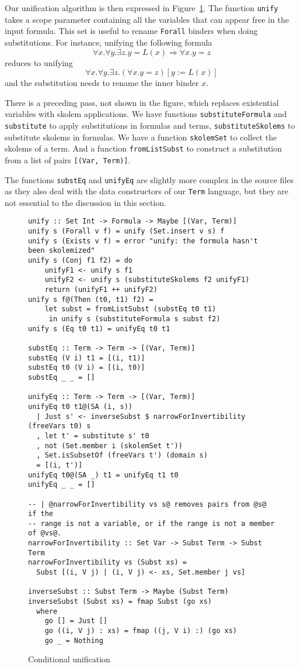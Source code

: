 \documentclass[sigconf, anonymous, review]{acmart}
\newcommand{\tc}[1]{{\small\texttt{#1}}}
\begin{document}
Our unification algorithm is then expressed in Figure~\ref{conditional-unification}.
The function \tc{unify} takes a scope parameter containing all the variables that
can appear free in the input formula. This set is useful to rename \tc{Forall}
binders when doing substitutions. For instance, unifying the following formula
$$\forall x. \forall y. \exists z. y = L(x) \Rightarrow \forall x. y = z$$
reduces to unifying
$$\forall x. \forall y. \exists z. (\forall x. y = z)[y:=L(x)]$$
and the substitution needs to rename the inner binder $x$.

There is a preceding pass, not shown in the figure, which replaces existential variables
with skolem applications. We have functions \tc{substituteFormula} and \tc{substitute}
to apply substitutions in formulas and terms, \tc{substituteSkolems} to  substitute
skolems in formulas. We have a function \tc{skolemSet} to collect the skolems of a
term. And a function \tc{fromListSubst} to construct a substitution from a list of
pairs \tc{[(Var, Term)]}.

The functions \tc{substEq} and \tc{unifyEq} are slightly more complex in the source files
as they also deal with the data constructors of our \tc{Term} language, but they are
not essential to the discussion in this section.

\begin{figure}
\begin{verbatim}
unify :: Set Int -> Formula -> Maybe [(Var, Term)]
unify s (Forall v f) = unify (Set.insert v s) f
unify s (Exists v f) = error "unify: the formula hasn't been skolemized"
unify s (Conj f1 f2) = do
    unifyF1 <- unify s f1
    unifyF2 <- unify s (substituteSkolems f2 unifyF1)
    return (unifyF1 ++ unifyF2)
unify s f@(Then (t0, t1) f2) =
    let subst = fromListSubst (substEq t0 t1)
     in unify s (substituteFormula s subst f2)
unify s (Eq t0 t1) = unifyEq t0 t1

substEq :: Term -> Term -> [(Var, Term)]
substEq (V i) t1 = [(i, t1)]
substEq t0 (V i) = [(i, t0)]
substEq _ _ = []

unifyEq :: Term -> Term -> [(Var, Term)]
unifyEq t0 t1@(SA (i, s))
  | Just s' <- inverseSubst $ narrowForInvertibility (freeVars t0) s
  , let t' = substitute s' t0
  , not (Set.member i (skolemSet t'))
  , Set.isSubsetOf (freeVars t') (domain s)
  = [(i, t')]
unifyEq t0@(SA _) t1 = unifyEq t1 t0
unifyEq _ _ = []

-- | @narrowForInvertibility vs s@ removes pairs from @s@ if the
-- range is not a variable, or if the range is not a member of @vs@.
narrowForInvertibility :: Set Var -> Subst Term -> Subst Term
narrowForInvertibility vs (Subst xs) =
  Subst [(i, V j) | (i, V j) <- xs, Set.member j vs]

inverseSubst :: Subst Term -> Maybe (Subst Term)
inverseSubst (Subst xs) = fmap Subst (go xs)
  where
    go [] = Just []
    go ((i, V j) : xs) = fmap ((j, V i) :) (go xs)
    go _ = Nothing
\end{verbatim}
\caption{Conditional unification}
\label{conditional-unification}
\end{figure}
\end{document}
